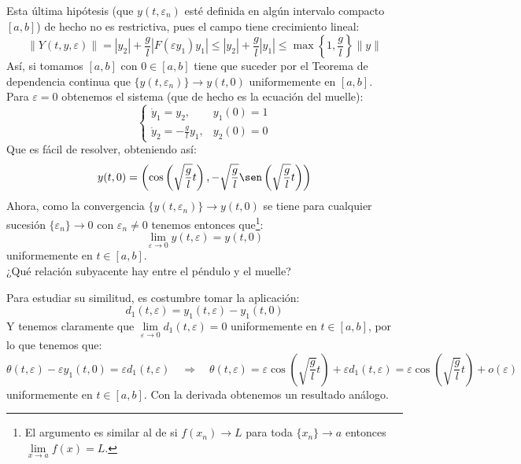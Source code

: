 \noindent
Esta última hipótesis (que $y(t,\varepsilon_n)$ esté definida en algún intervalo compacto $[a,b]$) de hecho no es restrictiva, pues el campo tiene crecimiento lineal:
\begin{equation*}
    \|Y(t,y,\varepsilon)\| = |y_2| + \frac{g}{l}|F(\varepsilon y_1)y_1| \leq |y_2| + \frac{g}{l}|y_1| \leq \max\left\{1, \frac{g}{l}\right\}\|y\|
\end{equation*}
Así, si tomamos $[a,b]$ con $0\in [a,b]$ tiene que suceder por el Teorema de dependencia continua que $\{y(t,\varepsilon_n)\}\to y(t,0)$ uniformemente en $[a,b]$.\\

\noindent
Para $\varepsilon = 0$ obtenemos el sistema (que de hecho es la ecuación del muelle):
\begin{equation*}
    \left\{\begin{array}{ll}
        \dot{y}_1 = y_2, & y_1(0) = 1 \\
        \dot{y}_2 = -\frac{g}{l}y_1, & y_2(0) = 0
    \end{array}\right.
\end{equation*}
Que es fácil de resolver, obteniendo así:
\begin{equation*}
    y(t,0) = \left(\cos\left(\sqrt{\frac{g}{l}}t\right), -\sqrt{\frac{g}{l}}\sen\left(\sqrt{\frac{g}{l}}t\right)\right)
\end{equation*}
Ahora, como la convergencia $\{y(t,\varepsilon_n)\}\to y(t,0)$ se tiene para cualquier sucesión $\{\varepsilon_n\}\to 0$ con $\varepsilon_n\neq 0$ tenemos entonces que\footnote{El argumento es similar al de si $f(x_n)\to L$ para toda $\{x_n\}\to a$ entonces $\lim\limits_{x\to a} f(x)= L$.}:
\begin{equation*}
    \lim_{\varepsilon\to0} y(t,\varepsilon) = y(t,0)
\end{equation*}
uniformemente en $t\in [a,b]$.\\

\noindent
¿Qué relación subyacente hay entre el péndulo y el muelle? 

\noindent
Para estudiar su similitud, es costumbre tomar la aplicación:
\begin{equation*}
    d_1(t,\varepsilon) = y_1(t,\varepsilon) - y_1(t,0)
\end{equation*}
Y tenemos claramente que $\lim\limits_{\varepsilon\to0}d_1(t,\varepsilon) = 0$ uniformemente en $t\in [a,b]$, por lo que tenemos que:
\begin{equation*}
    \theta(t,\varepsilon) - \varepsilon y_1(t,0) = \varepsilon d_1(t,\varepsilon) \quad\Longrightarrow\quad \theta(t,\varepsilon) = \varepsilon \cos\left(\sqrt{\frac{g}{l}}t\right) + \varepsilon d_1(t,\varepsilon) = \varepsilon\cos\left(\sqrt{\frac{g}{l}}t\right) + o(\varepsilon)
\end{equation*}
uniformemente en $t\in [a,b]$. Con la derivada obtenemos un resultado análogo.

